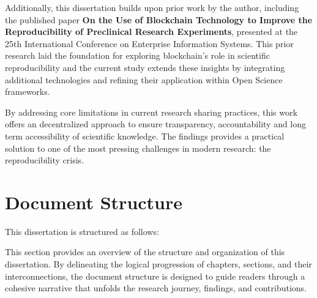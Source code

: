 \documentclass[final]{rc-book-2.14}
\begin{document}
Additionally, this dissertation builds upon prior work by the author, including the published paper \textbf{On the Use of Blockchain Technology to Improve the Reproducibility of Preclinical Research Experiments}\cite{oliveira2023blockchain}, presented at the 25th International Conference on Enterprise Information Systems. This prior research laid the foundation for exploring blockchain’s role in scientific reproducibility and the current study extends these insights by integrating additional technologies and refining their application within Open Science frameworks.

By addressing core limitations in current research sharing practices, this work offers an decentralized approach to ensure transparency, accountability and long term accessibility of scientific knowledge. The findings provides a practical solution to one of the most pressing challenges in modern research: the reproducibility crisis.


\section{Document Structure}
\label{sec:introduction:general-structure}

This dissertation is structured as follows:

This section provides an overview of the structure and organization of this dissertation. By delineating the logical progression of chapters, sections, and their interconnections, the document structure is designed to guide readers through a cohesive narrative that unfolds the research journey, findings, and contributions.
\end{document}
